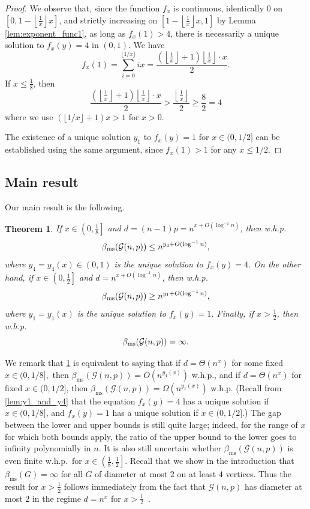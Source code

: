 \documentclass[12pt]{article}
\newtheorem{theorem}{Theorem}
\theoremstyle{definition}
\theoremstyle{remark}
\theoremstyle{remark}
\numberwithin{theorem}{section}
\newcommand{\Gnp}{\mathcal{G}(n,p)}
\begin{document}
\begin{proof}
    We observe that, since the function $f_{x}$ is continuous, identically $0$ on $\left[0, 1-\left\lfloor\frac{1}{x}\right\rfloor x \right]$, and strictly increasing on $\left[1-\left\lfloor\frac{1}{x}\right\rfloor x, 1\right]$ by Lemma \ref{lem:exponent_func1}, as long as $f_{x}(1) > 4$, there is necessarily a unique solution to $f_{x}(y) = 4$ in $(0,1)$. We have
	$$
		f_{x}(1) = \sum_{i=0}^{\lfloor1/x\rfloor}ix = \frac{\left(\left\lfloor\frac{1}{x}\right\rfloor + 1\right)\left\lfloor\frac{1}{x}\right\rfloor \cdot x}{2}.
	$$
If $x \leq \frac{1}{8}$, then
	$$
		 \frac{\left(\left\lfloor\frac{1}{x}\right\rfloor + 1\right)\left\lfloor\frac{1}{x}\right\rfloor \cdot x}{2} > \frac{\left\lfloor\frac{1}{x}\right\rfloor}{2} \geq \frac{8}{2} = 4
	$$
where we use $(\lfloor1/x\rfloor + 1)x > 1$ for $x > 0$. 

The existence of a unique solution $y_{1}$ to $f_{x}(y) = 1$ for $x \in (0,1/2]$ can be established using the same argument, since $f_x(1) > 1$ for any $x \le 1/2$.
\end{proof}

\subsection{Main result}

Our main result is the following.

\begin{theorem}\label{thm:main_result}
	If $x \in \left(0, \frac{1}{8}\right]$ and $d = (n-1)p = n^{x + O(\log^{-1}n)}$, then w.h.p.
		$$
			\beta_{\textup{ms}}(\Gnp) \leq n^{y_{4} + O(\log^{-1}n)},
		$$
	where $y_{4} = y_{4}(x) \in (0,1)$ is the unique solution to $f_{x}(y) = 4$. On the other hand, if $x \in \left(0, \frac{1}{2} \right]$ and $d = n^{x + O(\log^{-1}n)}$, then w.h.p.
		$$
			\beta_{\textup{ms}}(\Gnp) \geq n^{y_{1} + O(\log^{-1}n)},
		$$
	where $y_{1} = y_{1}(x)$ is the unique solution to $f_{x}(y) = 1$. Finally, if $x > \frac{1}{2}$, then w.h.p. 
		$$
			\beta_{\textup{ms}}(\Gnp) = \infty.
		$$
\end{theorem}

We remark that \cref{thm:main_result} is equivalent to saying that if $d = \Theta(n^{x})$ for some fixed $x \in (0,1/8],$ then $\beta_{\text{ms}}(\Gnp) = O(n^{y_{4}(x)})$ w.h.p., and if $d = \Theta(n^{x})$ for fixed $x \in (0,1/2]$, then $\beta_{\text{ms}}(\Gnp) = \Omega(n^{y_{1}(x)})$ w.h.p. (Recall from \cref{lem:y1_and_y4} that the equation $f_{x}(y) = 4$ has a unique solution if $x \in (0, 1/8]$, and $f_{x}(y) = 1$ has a unique solution if $x \in (0,1/2].$) The gap between the lower and upper bounds is still quite large; indeed, for the range of $x$ for which both  bounds apply, the ratio of the upper bound to the lower goes to infinity polynomially in $n$. It is also still uncertain whether $\beta_{\text{ms}}(\Gnp)$ is even finite w.h.p.\ for $x \in \left(\frac{1}{8},\frac{1}{2} \right]$. Recall that we show in the introduction that $\beta_{\text{ms}}(G) = \infty$ for all $G$ of diameter at most $2$ on at least $4$ vertices. Thus the result for $x > \frac{1}{2}$ follows immediately from the fact that $\Gnp$ has diameter at most $2$ in the regime $d = n^{x}$ for $x>\frac{1}{2}$~\cite{bollobas1998random}.
\end{document}
